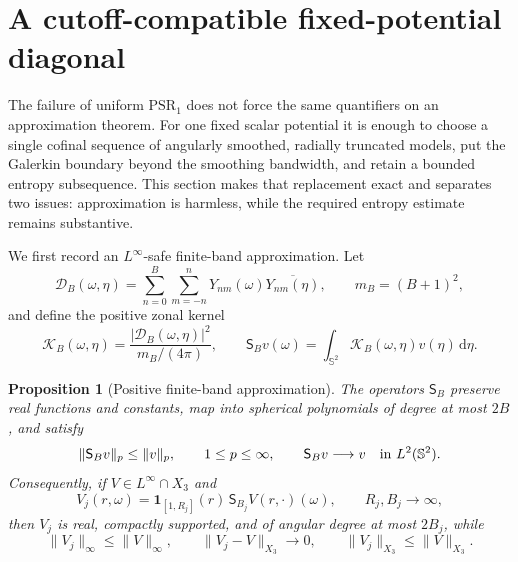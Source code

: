 \documentclass[11pt]{article}
\newcommand{\dd}{\,\mathrm d}
\newtheorem{proposition}[theorem]{Proposition}
\theoremstyle{definition}
\theoremstyle{remark}
\begin{document}
\section{A cutoff-compatible fixed-potential diagonal}
\label{app:buffered-diagonal}

The failure of uniform $\mathrm{PSR}_1$ does not force the same quantifiers on
an approximation theorem.  For one fixed scalar potential it is enough to
choose a single cofinal sequence of angularly smoothed, radially truncated
models, put the Galerkin boundary beyond the smoothing bandwidth, and retain a
bounded entropy subsequence.  This section makes that replacement exact and
separates two issues: approximation is harmless, while the required entropy
estimate remains substantive.

We first record an $L^\infty$-safe finite-band approximation.  Let
\begin{equation}
 \mathcal D_B(\omega,\eta)
 =\sum_{n=0}^{B}\sum_{m=-n}^{n}
   Y_{nm}(\omega)\overline{Y_{nm}(\eta)},
 \qquad m_B=(B+1)^2,
\end{equation}
and define the positive zonal kernel
\begin{equation}
 \mathcal K_B(\omega,\eta)
 =\frac{|\mathcal D_B(\omega,\eta)|^2}{m_B/(4\pi)},
 \qquad
 \mathsf S_Bv(\omega)=\int_{\mathbb S^2}
   \mathcal K_B(\omega,\eta)v(\eta)\dd\eta.
 \label{eq:positive-angular-smoother}
\end{equation}

\begin{proposition}[Positive finite-band approximation]
\label{prop:positive-finite-band-approximation}
The operators $\mathsf S_B$ preserve real functions and constants, map into
spherical polynomials of degree at most $2B$, and satisfy
\begin{equation}
 \|\mathsf S_Bv\|_p\leq\|v\|_p,
 \qquad 1\leq p\leq\infty,
 \qquad
 \mathsf S_Bv\longrightarrow v\quad\hbox{in }L^2(\mathbb S^2).
 \label{eq:positive-angular-smoother-bounds}
\end{equation}
Consequently, if $V\in L^\infty\cap X_3$ and
\begin{equation}
 V_j(r,\omega)=\mathbf1_{[1,R_j]}(r)\,
                   \mathsf S_{B_j}V(r,\cdot)(\omega),
 \qquad R_j,B_j\longrightarrow\infty,
 \label{eq:buffered-potential-approximants}
\end{equation}
then $V_j$ is real, compactly supported, and of angular degree at most $2B_j$,
while
\begin{equation}
 \|V_j\|_\infty\leq\|V\|_\infty,
 \qquad
 \|V_j-V\|_{X_3}\longrightarrow0,
 \qquad
 \|V_j\|_{X_3}\leq\|V\|_{X_3}.
 \label{eq:buffered-potential-convergence}
\end{equation}
\end{proposition}
\end{document}
